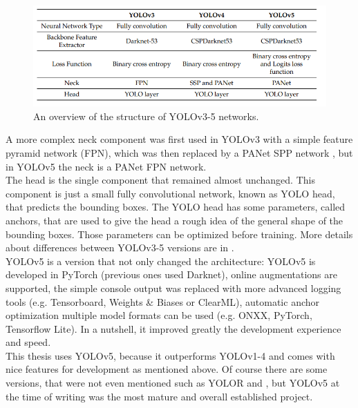 \begin{figure}
\includegraphics[width=\textwidth]{images/yolo_images/yolo_compare}
\caption{An overview of the structure of YOLOv3-5 networks. \cite{yolo_compare}}
\end{figure}

A more complex neck component was first used in YOLOv3 with a simple feature pyramid network (FPN), which was then replaced by a PANet SPP network \cite{panet_paper, spp_paper}, but in YOLOv5 the neck is a PANet FPN network. \\
The head is the single component that remained almost unchanged. This component is just a small fully convolutional network, known as YOLO head, that predicts the bounding boxes. The YOLO head has some parameters, called anchors, that are used to give the head a rough idea of the general shape of the bounding boxes. Those parameters can be optimized before training.  More details about differences between YOLOv3-5 versions are in \cite{yolo_compare}.\\




YOLOv5 is a version that not only changed the architecture: YOLOv5 is developed in PyTorch (previous ones used Darknet), online augmentations are supported, the simple console output was replaced with more advanced logging tools (e.g. Tensorboard, Weights \& Biases or ClearML), automatic anchor optimization multiple model formats can be used (e.g. ONXX, PyTorch, Tensorflow Lite). In a nutshell, it improved greatly the development experience and speed. \\
This thesis uses YOLOv5, because it outperforms YOLOv1-4 \cite{yolox_paper} and comes with nice features for development as mentioned above. Of course there are some versions, that were not even mentioned such as YOLOR \cite{yolor_paper} and \cite{yolox_paper}, but YOLOv5 at the time of writing was the most mature and overall established project. \\




